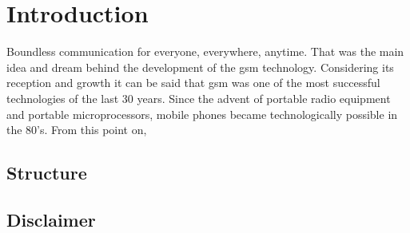 \chapter{Introduction}
Boundless communication for everyone, everywhere, anytime.
That was the main idea and dream behind the development of the \gls{gsm} technology.
Considering its reception and growth \cite{GSM2009,GSM_history2011,GSM_stats2011} it can be said that \gls{gsm} was one of the most successful technologies of the last 30 years.
Since the advent of portable radio equipment and portable microprocessors, mobile phones became technologically possible in the 80's.
From this point on, 

\section{Structure}

\section{Disclaimer}
